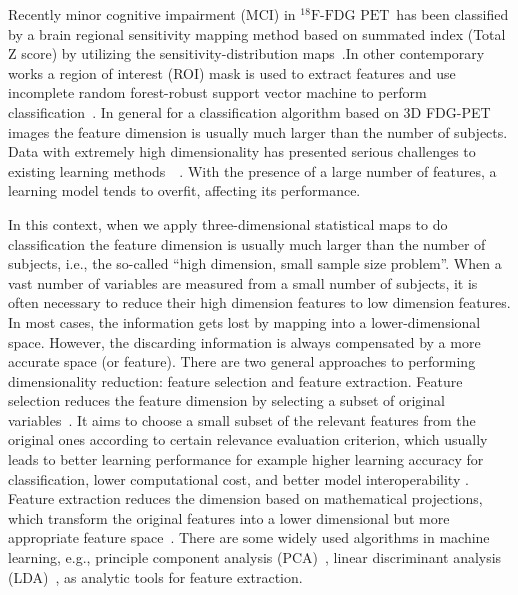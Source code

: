 \documentclass[authoryear,preprint,revi	ew,12pt]{elsarticle}
\newcommand{\FDGPET}   {$ ^{18}\textrm{F-FDG PET} $}
\begin{document}
Recently minor cognitive impairment (MCI) in \FDGPET ~has been classified by a brain regional sensitivity mapping method based on summated index (Total Z score) by utilizing the sensitivity-distribution maps~\citep{kakimoto2011new}.In other contemporary works a region of interest (ROI) mask is used to extract features and use incomplete random forest-robust support vector machine to perform classification~\citep{lu2017early}. In general for a classification algorithm based on 3D FDG-PET images the feature dimension is usually much larger than the number of subjects. Data with extremely high dimensionality has presented serious challenges to existing learning methods~\citep{liu2007computational}~\citep{friedman2001elements}. With the presence of a large number of features, a learning model tends to overfit, affecting its performance.

In this context, when we apply three-dimensional statistical maps to do classification the feature dimension is usually much larger than the number of subjects, i.e., the so-called “high dimension, small sample size problem”. When a vast number of variables are measured from a small number of subjects, it is often necessary to reduce their high dimension features to low dimension features. In most cases, the information gets lost by mapping into a lower-dimensional space. However, the discarding information is always compensated by a more accurate space (or feature). There are two general approaches to performing dimensionality reduction: feature selection and feature extraction. Feature selection reduces the feature dimension by selecting a subset of original variables~\citep{jain1997feature}. It aims to choose a small subset of the relevant features from the original ones according to certain relevance evaluation criterion, which usually leads to better learning performance for example higher learning accuracy for classification, lower computational cost, and better model interoperability \citep{tang2014feature}. Feature extraction reduces the dimension based on mathematical projections, which transform the original features into a lower dimensional but more appropriate feature space~\citep{guyon2008feature}. There are some widely used algorithms in machine learning, e.g., principle component analysis (PCA)~\citep{jolliffe2002principal}, linear discriminant analysis (LDA)~\citep{mika1999fisher}, as analytic tools for feature extraction.
\end{document}
